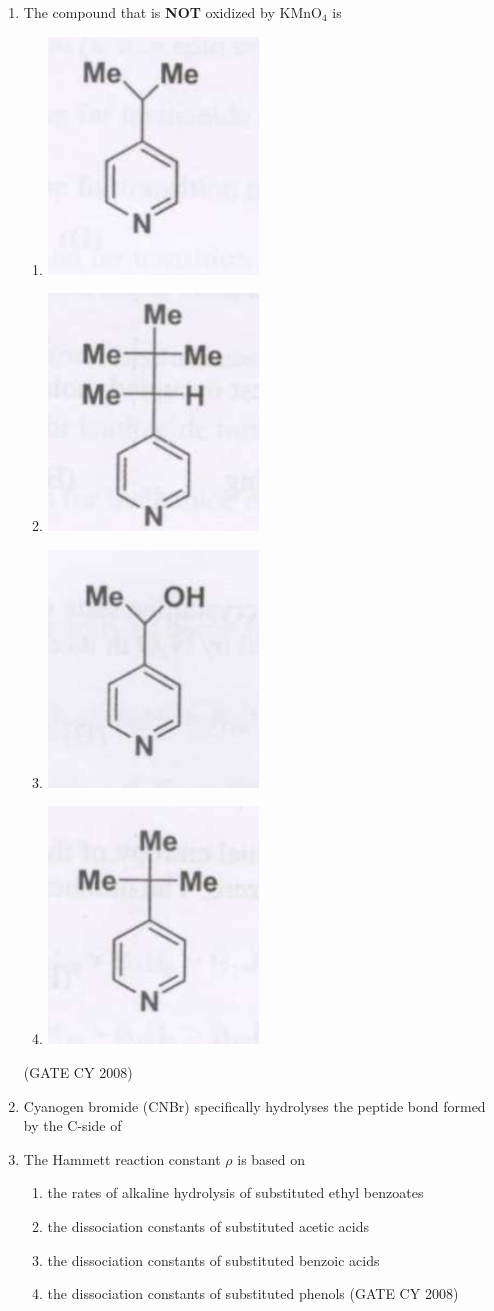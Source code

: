 \documentclass[12pt]{article}
\begin{document}
\begin{enumerate}
    

   \item  The compound that is \textbf{NOT} oxidized by KMnO$_4$ is
\begin{enumerate}
     \item \includegraphics[width=0.1\columnwidth]{figs/q12 a.png}
     \item \includegraphics[width=0.1\columnwidth]{figs/q12 b.png}
     \item \includegraphics[width=0.1\columnwidth]{figs/q12 c.png}
     \item \includegraphics[width=0.1\columnwidth]{figs/q12 d.png}
\end{enumerate}
   \hfill{(GATE CY 2008)}


   \item  Cyanogen bromide (CNBr) specifically hydrolyses the peptide bond formed by the C-side of
   \begin{enumerate}
\end{enumerate}

    

    \item The Hammett reaction constant $\rho$ is based on
    \begin{enumerate}
    \item  the rates of alkaline hydrolysis of substituted ethyl benzoates
    \item  the dissociation constants of substituted acetic acids
    \item  the dissociation constants of substituted benzoic acids
    \item  the dissociation constants of substituted phenols    \hfill{(GATE CY 2008)}
    \end{enumerate}



\end{enumerate}
\end{document}
